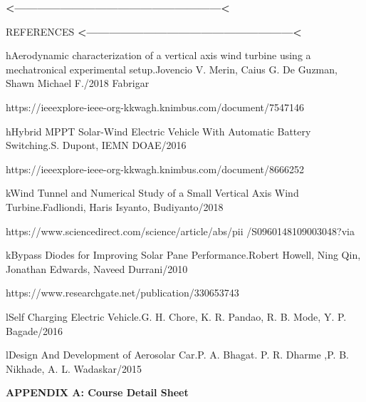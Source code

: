 \documentclass[a4paper,12pt]{article}
\begin{document}
\newpage
\thispagestyle{empty}
\vspace*{0.25\textheight}
\begin{center}
\begin{center}
{\bfseries\LARGE <------------------------------------------------------<}



{\scshape\Huge REFERENCES}
{\bfseries\LARGE <------------------------------------------------------<}
\end{center}
\end{center}
\newpage
\begin{thebibliography}{REFERENCES}

\bibitem hAerodynamic characterization of a vertical axis wind turbine using a mechatronical experimental setup.Jovencio V. Merin, Caius G. De Guzman, Shawn Michael F./2018
Fabrigar

https://ieeexplore-ieee-org-kkwagh.knimbus.com/document/7547146


\bibitem hHybrid MPPT Solar-Wind Electric Vehicle With Automatic Battery Switching.S. Dupont, IEMN DOAE/2016

https://ieeexplore-ieee-org-kkwagh.knimbus.com/document/8666252


\bibitem kWind Tunnel and Numerical Study of a Small Vertical Axis Wind Turbine.Fadliondi, Haris Isyanto, Budiyanto/2018

https://www.sciencedirect.com/science/article/abs/pii
/S0960148109003048?via


\bibitem kBypass Diodes for Improving Solar Pane Performance.Robert Howell, Ning Qin, Jonathan Edwards, Naveed Durrani/2010

https://www.researchgate.net/publication/330653743

\bibitem lSelf Charging Electric Vehicle.G. H. Chore, K. R. Pandao, R. B. Mode, Y. P. Bagade/2016

\bibitem lDesign And Development of Aerosolar Car.P. A. Bhagat. P. R. Dharme ,P. B. Nikhade, A. L. Wadaskar/2015

\end{thebibliography}

\appendix
\newpage
\thispagestyle{empty}
\vspace*{0.25\textheight}
\begin{center}
\LARGE\textbf{APPENDIX A: Course Detail Sheet}
\end{center}
\newpage


\newpage
\end{document}
